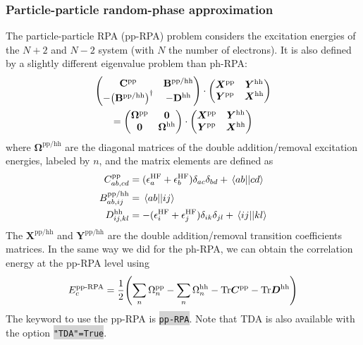 \documentclass[aip,jcp,reprint,noshowkeys,superscriptaddress]{revtex4-1}
\newcommand{\HF}{\text{HF}}
\newcommand{\pp}{\text{pp}}
\newcommand{\hh}{\text{hh}}
\newcommand{\ep}{\epsilon}
\newcommand{\bO}{\mathbf{0}}
\newcommand{\bX}{\bm{X}}
\newcommand{\bY}{\bm{Y}}
\newcommand{\bB}{\mathbf{B}}
\newcommand{\bC}{\mathbf{C}}
\newcommand{\bD}{\mathbf{D}}
\newcommand{\bOme}{\boldsymbol{\Omega}}
\newcommand{\EcppRPA}{E_c^{\text{pp-RPA}}}
\newcommand{\pERI}[2]{\mel{#1}{}{#2}}
\newcommand{\keyword}[1]{{\colorbox{lightgray}{\texttt{#1}}}}
\begin{document}
\subsubsection*{Particle-particle random-phase approximation}
\label{subsec:pp-RPA}

The particle-particle RPA (pp-RPA) problem considers the excitation energies of the $N+2$ and $N-2$ system (with $N$ the number of electrons). It is also defined by a slightly different eigenvalue problem than ph-RPA:
\begin{multline}
\label{eq:ppRPA}
	\begin{pmatrix}
		\bC^{\pp} & \bB^{\pp/\hh}
		\\
		-\qty(\bB^{\pp/\hh})^{\dag} &  -\bD^{\hh}
	\end{pmatrix}
	\cdot
	\begin{pmatrix}
		\bX^{\pp} & \bY^{\hh}
		\\
		\bY^{\pp} & \bX^{\hh}
	\end{pmatrix}
	\\
	=
	\begin{pmatrix}
		\bOme^{\pp} & \bO 
		\\
		\bO & \bOme^{\hh}
	\end{pmatrix}
	\cdot
	\begin{pmatrix}
		\bX^{\pp} & \bY^{\hh}
		\\
		\bY^{\pp} & \bX^{\hh}
	\end{pmatrix}
\end{multline} 
where $\bOme^{\pp/\hh}$ are the diagonal matrices of the double addition/removal excitation energies, labeled by $n$, and the matrix elements are defined as 
\begin{subequations}
\begin{align}
	C_{ab,cd}^{\pp} 
	& = (\ep_{a}^{\HF} + \ep_{b}^{\HF}) \delta_{ac} \delta_{bd} + \pERI{ab}{cd}
	\\
	B_{ab,ij}^{\pp/\hh} 
	& = \pERI{ab}{ij}
	\\
	D_{ij,kl}^{\hh} 
	& = -(\ep_{i}^{\HF} + \ep_{j}^{\HF}) \delta_{ik} \delta_{jl} + \pERI{ij}{kl}
\end{align}
\end{subequations}
The $\bX^{\pp/\hh}$ and $\bY^{\pp/\hh}$ are the double addition/removal transition coefficients matrices. In the same way we did for the ph-RPA, we can obtain the correlation energy at the pp-RPA level using \cite{Peng_2013}
\begin{equation}
\EcppRPA =  \frac{1}{2} \qty(\sum_n \Omega_n^{\pp}  - \sum_n \Omega_n^{\hh}  - \text{Tr}\bm{C}^{\pp} - \text{Tr}\bm{D}^{\hh})
\end{equation}
The keyword to use the pp-RPA is \keyword{pp-RPA}. Note that TDA is also available with the option \keyword{"TDA"=True}.
\end{document}

